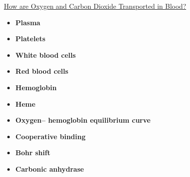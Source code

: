\documentclass[12pt,letterpaper]{article}
\begin{document}
\hypertarget{42.4}{}
\begin{secbox}{\hyperlink{42}{How are Oxygen and Carbon Dioxide Transported in Blood?}}{
    \begin{itemize}
        \item \textbf{Plasma}
        \item \textbf{Platelets }
        \item \textbf{White blood cells }
        \item \textbf{Red blood cells}
        \item \textbf{Hemoglobin}
        \item \textbf{Heme}
        \item \textbf{Oxygen– hemoglobin equilibrium curve}
        \item \textbf{Cooperative binding}
        \item \textbf{Bohr shift}
        \item \textbf{Carbonic anhydrase}
    \end{itemize}
}\end{secbox}
\end{document}
